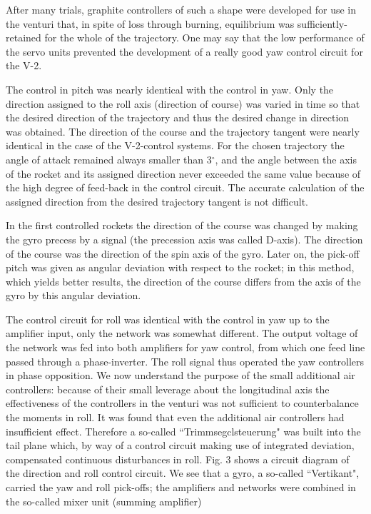 \documentclass[11pt, a4paper]{article}
\begin{document}
After many trials, graphite controllers of such a shape were developed for use in the venturi that, in spite of loss through burning, equilibrium was sufficiently- retained for the whole of the trajectory. One may say that the low performance of the servo units prevented the development of a really good yaw control circuit for the V-2.

The control in pitch was nearly identical with the control in yaw. Only the direction assigned to the roll axis (direction of course) was varied in time so that the desired direction of the trajectory and thus the desired change in direction was obtained. The direction of the course and the trajectory tangent were nearly identical in the case of the V-2-control systems. For the chosen trajectory the angle of attack remained always smaller than 3$^\circ$, and the angle between the axis of the rocket and its assigned direction never exceeded the same value because of the high degree of feed-back in the control circuit. The accurate calculation of the assigned direction from the desired trajectory tangent is not difficult.

In the first controlled rockets the direction of the course was changed by making the gyro precess by a signal (the precession axis was called D-axis). The direction of the course was the direction of the spin axis of the gyro. Later on, the pick-off pitch was given as angular deviation with respect to the rocket; in this method, which yields better results, the direction of the course differs from the axis of the gyro by this angular deviation.

The control circuit for roll was identical with the control in yaw up to the amplifier input, only the network was somewhat different. The output voltage of the network was fed into both amplifiers for yaw control, from which one feed line passed through a phase-inverter. The roll signal thus operated the yaw controllers in phase opposition. We now understand the purpose of the small additional air controllers: because of their small leverage about the longitudinal axis the effectiveness of the controllers in the venturi was not sufficient to counterbalance the moments in roll. It was found that even the additional air controllers had insufficient effect. Therefore a so-called ``Trimmsegclsteuerung" was built into the tail plane which, by way of a control circuit making use of integrated deviation, compensated continuous disturbances in roll. Fig. 3 shows a circuit diagram of the direction and roll control circuit. We see that a gyro, a so-called ``Vertikant", carried the yaw and roll pick-offs; the amplifiers and networks were combined in the so-called mixer unit (summing amplifier)
\end{document}
